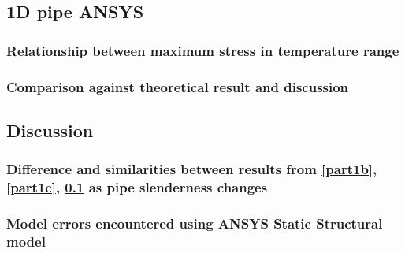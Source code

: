 \subsection{1D pipe ANSYS}\label{part1d}
\subsubsection{Relationship between maximum stress in temperature range}
\subsubsection{Comparison against theoretical result and discussion}
\subsection{Discussion}
\subsubsection{Difference and similarities between results from \ref{part1b}, \ref{part1c}, \ref{part1d} as pipe slenderness changes}
\subsubsection{Model errors encountered using ANSYS Static Structural model}